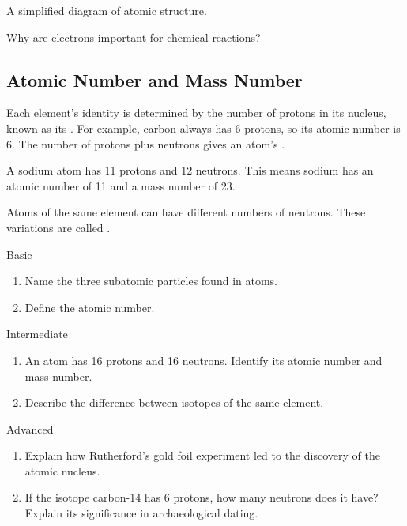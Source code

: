 \begin{marginfigure}
\centering
\caption{A simplified diagram of atomic structure.}
\end{marginfigure}

\begin{stopandthink}
Why are electrons important for chemical reactions?
\end{stopandthink}

\subsection{Atomic Number and Mass Number}

Each element's identity is determined by the number of protons in its nucleus, known as its . For example, carbon always has 6 protons, so its atomic number is 6. The number of protons plus neutrons gives an atom's .

\begin{example}
A sodium atom has 11 protons and 12 neutrons. This means sodium has an atomic number of 11 and a mass number of 23.
\end{example}

Atoms of the same element can have different numbers of neutrons. These variations are called .

\begin{tieredquestions}{Basic}
\begin{enumerate}
	\item Name the three subatomic particles found in atoms.
	\item Define the atomic number.
\end{enumerate}
\end{tieredquestions}

\begin{tieredquestions}{Intermediate}
\begin{enumerate}
	\item An atom has 16 protons and 16 neutrons. Identify its atomic number and mass number. 
	\item Describe the difference between isotopes of the same element.
\end{enumerate}
\end{tieredquestions}

\begin{tieredquestions}{Advanced}
\begin{enumerate}
	\item Explain how Rutherford's gold foil experiment led to the discovery of the atomic nucleus.
	\item If the isotope carbon-14 has 6 protons, how many neutrons does it have? Explain its significance in archaeological dating.
\end{enumerate}
\end{tieredquestions}

